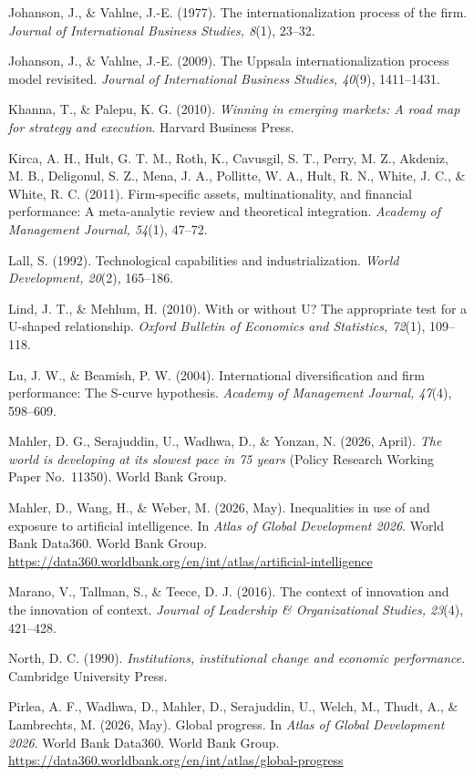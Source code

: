 \documentclass[
  12pt,a4paper]{article}
\begin{document}
Johanson, J., \& Vahlne, J.-E. (1977). The internationalization process
of the firm. \emph{Journal of International Business Studies, 8}(1),
23--32.

Johanson, J., \& Vahlne, J.-E. (2009). The Uppsala internationalization
process model revisited. \emph{Journal of International Business
Studies, 40}(9), 1411--1431.

Khanna, T., \& Palepu, K. G. (2010). \emph{Winning in emerging markets:
A road map for strategy and execution}. Harvard Business Press.

Kirca, A. H., Hult, G. T. M., Roth, K., Cavusgil, S. T., Perry, M. Z.,
Akdeniz, M. B., Deligonul, S. Z., Mena, J. A., Pollitte, W. A., Hult, R.
N., White, J. C., \& White, R. C. (2011). Firm-specific assets,
multinationality, and financial performance: A meta-analytic review and
theoretical integration. \emph{Academy of Management Journal, 54}(1),
47--72.

Lall, S. (1992). Technological capabilities and industrialization.
\emph{World Development, 20}(2), 165--186.

Lind, J. T., \& Mehlum, H. (2010). With or without U? The appropriate
test for a U-shaped relationship. \emph{Oxford Bulletin of Economics and
Statistics, 72}(1), 109--118.

Lu, J. W., \& Beamish, P. W. (2004). International diversification and
firm performance: The S-curve hypothesis. \emph{Academy of Management
Journal, 47}(4), 598--609.

Mahler, D. G., Serajuddin, U., Wadhwa, D., \& Yonzan, N. (2026, April).
\emph{The world is developing at its slowest pace in 75 years} (Policy
Research Working Paper No.~11350). World Bank Group.

Mahler, D., Wang, H., \& Weber, M. (2026, May). Inequalities in use of
and exposure to artificial intelligence. In \emph{Atlas of Global
Development 2026}. World Bank Data360. World Bank Group.
\url{https://data360.worldbank.org/en/int/atlas/artificial-intelligence}

Marano, V., Tallman, S., \& Teece, D. J. (2016). The context of
innovation and the innovation of context. \emph{Journal of Leadership \&
Organizational Studies, 23}(4), 421--428.

North, D. C. (1990). \emph{Institutions, institutional change and
economic performance}. Cambridge University Press.

Pirlea, A. F., Wadhwa, D., Mahler, D., Serajuddin, U., Welch, M., Thudt,
A., \& Lambrechts, M. (2026, May). Global progress. In \emph{Atlas of
Global Development 2026}. World Bank Data360. World Bank Group.
\url{https://data360.worldbank.org/en/int/atlas/global-progress}
\end{document}
